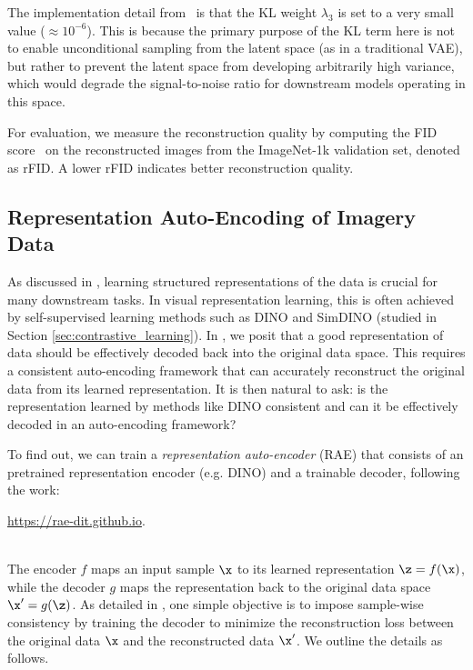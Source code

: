 \documentclass[../../book-main.tex]{subfiles}
\begin{document}
The implementation detail from~\citep{rombach2022high} is that the KL
weight $\lambda_3$ is set to a very small value ($\approx 10^{-6}$).
This is because the primary purpose of the KL term here is not to
enable unconditional sampling from the latent space (as in a
traditional VAE), but rather to prevent the latent space from
developing arbitrarily high variance, which would degrade the
signal-to-noise ratio for downstream models operating in this space.

For evaluation, we measure the reconstruction quality by computing
the FID score~\citep{heusel2017gans} on the reconstructed images from
the ImageNet-1k validation set, denoted as rFID. A lower rFID
indicates better reconstruction quality.

\subsection{Representation Auto-Encoding of Imagery Data}
\label{sec:RAE-implement}

\newcommand{\gc}[1]{\textcolor{deemph}{#1}}
\newcommand{\tablestyle}[2]{\setlength{\tabcolsep}{#1}\renewcommand{\arraystretch}{#2}\centering\scriptsize}

As discussed in , learning structured
representations of the data is crucial for many downstream tasks. In
visual representation learning, this is often achieved by
self-supervised learning methods such as DINO
\cite{caron2021emerging} and SimDINO (studied in Section
\ref{sec:contrastive_learning}). In
, we posit
that a good representation of data should be effectively decoded back
into the original data space. This requires a consistent
auto-encoding framework that can accurately reconstruct the original
data from its learned representation. It is then natural to ask: is
the representation learned by methods like DINO consistent and can it
be effectively decoded in an auto-encoding framework?

To find out, we can train a \textit{representation auto-encoder}
(RAE) that consists of an pretrained representation encoder (e.g.
DINO) and a trainable decoder, following the work:\\
\centerline{\url{https://rae-dit.github.io}.}\\
The encoder $f$ maps an input sample
$\x$ to its learned representation $\z = f(\x)$, while the decoder
$g$ maps the representation back to the original data space
$\x'=g(\z)$. As detailed in , one simple
objective is to impose sample-wise consistency by training the
decoder to minimize the reconstruction loss between the original data
$\x$ and the reconstructed data $\x'$. We outline the details as follows.
\end{document}
